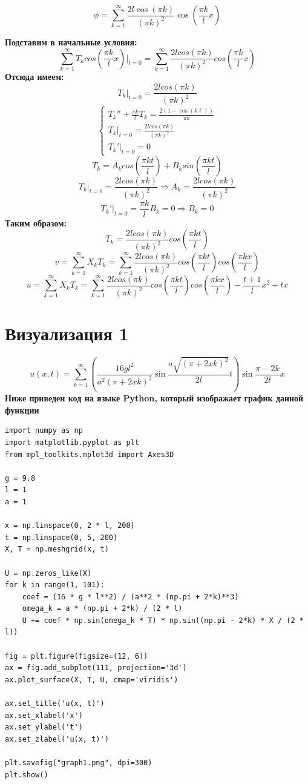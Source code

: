 \documentclass[a4paper,12pt]{article}
\begin{document}
$$\phi = \sum_{k=1}^{\infty} \frac{2l\cos(\pi k)}{(\pi k)^2} \cos\left( \frac{\pi k}{l} x \right)$$



\textbf{Подставим в начальные условия:}
$$\sum_{k=1}^{\infty}T_k cos(\frac{\pi k}{l}x)|_{t=0} = \sum_{k=1}^{\infty}\frac{2lcos(\pi k)}{(\pi k)^2}cos(\frac{\pi k}{l}x)$$
\textbf{Отсюда имеем:}
$$T_k|_{t=0} = \frac{2l cos(\pi k)}{(\pi k)^2}$$
$$
\begin{cases}
    T_k'' + \frac{\pi k}{l}T_k = \frac{2(1 - \cos(k \ell))}{\pi k} \\
    T_k|_{t=0} = \frac{2l cos(\pi k)}{(\pi k)^2} \\
    T_k'|_{t=0} = 0
\end{cases}
$$
$$T_k = A_k cos(\frac{\pi kt}{l}) + B_k sin(\frac{\pi kt}{l})$$
$$T_k |_{t=0} = \frac{2l cos(\pi k)}{(\pi k)^2} \Rightarrow A_k = \frac{2l cos(\pi k)}{(\pi k)^2}$$
$$T_k' |_{t=0} = \frac{\pi k}{l}B_k = 0 \Rightarrow B_k = 0$$
\textbf{Таким образом:}
$$T_k = \frac{2l cos(\pi k)}{(\pi k)^2}cos(\frac{\pi k t}{l})$$
$$v = \sum_{k=1}^{\infty}X_k T_k = \sum_{k=1}^{\infty} \frac{2l cos(\pi k)}{(\pi k)^2}cos(\frac{\pi k t}{l})cos(\frac{\pi k x}{l})$$
$$u = \sum_{k=1}^{\infty}X_k T_k = \sum_{k=1}^{\infty} \frac{2l cos(\pi k)}{(\pi k)^2}cos(\frac{\pi k t}{l})cos(\frac{\pi k x}{l}) - \frac{t+1}{l}x^2 + tx$$

\section*{Визуализация 1}
$$u(x,t) = \sum_{k=1}^\infty \left( \frac{16 g l^2}{a^2 (\pi + 2 x k)^3} \sin \frac{a \sqrt{(\pi + 2 x k)^2}}{2 l} t \right) \sin \frac{\pi - 2 k}{2 l} x$$
\textbf{Ниже приведен код на языке Python, который изображает график данной функции}
\begin{lstlisting}
import numpy as np
import matplotlib.pyplot as plt
from mpl_toolkits.mplot3d import Axes3D

g = 9.8
l = 1
a = 1

x = np.linspace(0, 2 * l, 200)
t = np.linspace(0, 5, 200)
X, T = np.meshgrid(x, t)

U = np.zeros_like(X)
for k in range(1, 101):
    coef = (16 * g * l**2) / (a**2 * (np.pi + 2*k)**3)
    omega_k = a * (np.pi + 2*k) / (2 * l)
    U += coef * np.sin(omega_k * T) * np.sin((np.pi - 2*k) * X / (2 * l))

fig = plt.figure(figsize=(12, 6))
ax = fig.add_subplot(111, projection='3d')
ax.plot_surface(X, T, U, cmap='viridis')

ax.set_title('u(x, t)')
ax.set_xlabel('x')
ax.set_ylabel('t')
ax.set_zlabel('u(x, t)')

plt.savefig("graph1.png", dpi=300)
plt.show()
\end{lstlisting}
\end{document}
